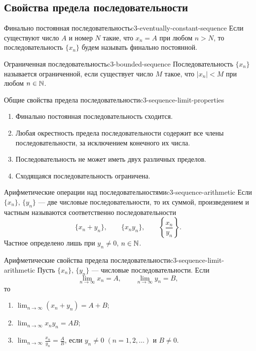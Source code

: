 \subsection{Свойства предела последовательности}

\begin{definition}{Финально постоянная последовательность}{c3-eventually-constant-sequence}
  Если существуют число $A$ и номер $N$ такие, что $x_n=A$ при любом
  $n>N$, то последовательность $\{x_n\}$ будем называть финально
  постоянной.
\end{definition}

\begin{definition}{Ограниченная последовательность}{c3-bounded-sequence}
  Последовательность $\{x_n\}$ называется ограниченной, если существует
  число $M$ такое, что $|x_n|<M$ при любом $n\in\mathbb{N}$.
\end{definition}

\begin{theorem}{Общие свойства предела последовательности}{c3-sequence-limit-properties}
  \begin{enumerate}[label=\alph*)]
    \item Финально постоянная последовательность сходится.
    \item Любая окрестность предела последовательности содержит все члены
      последовательности, за исключением конечного их числа.
    \item Последовательность не может иметь двух различных пределов.
    \item Сходящаяся последовательность ограничена.
  \end{enumerate}
\end{theorem}

\begin{definition}{Арифметические операции над последовательностями}{c3-sequence-arithmetic}
  Если $\{x_n\}$, $\{y_n\}$ — две числовые последовательности, то их
  суммой, произведением и частным называются соответственно
  последовательности
  \[
    \{x_n+y_n\},\qquad \{x_ny_n\},\qquad
    \left\{\frac{x_n}{y_n}\right\}.
  \]
  Частное определено лишь при $y_n\ne0$, $n\in\mathbb{N}$.
\end{definition}

\begin{theorem}{Арифметические свойства предела последовательности}{c3-sequence-limit-arithmetic}
  Пусть $\{x_n\}$, $\{y_n\}$ — числовые последовательности. Если
  \[
    \lim_{n\to\infty}x_n=A,
    \qquad
    \lim_{n\to\infty}y_n=B,
  \]
  то
  \begin{enumerate}[label=\alph*)]
    \item $\displaystyle\lim_{n\to\infty}(x_n+y_n)=A+B$;
    \item $\displaystyle\lim_{n\to\infty}x_ny_n=AB$;
    \item $\displaystyle\lim_{n\to\infty}\frac{x_n}{y_n}=\frac AB$,
      если $y_n\ne0$ $(n=1,2,\ldots)$ и $B\ne0$.
  \end{enumerate}
\end{theorem}


